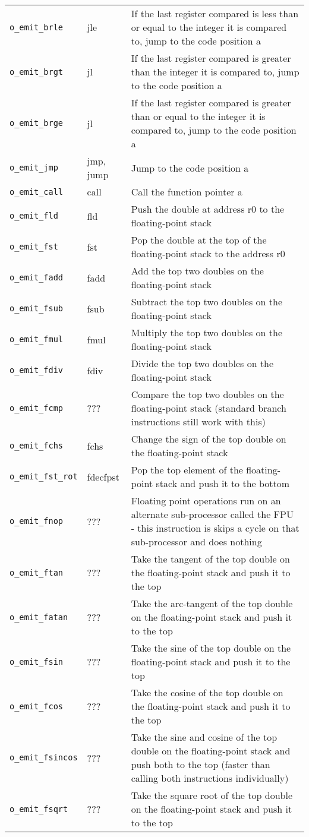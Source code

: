 \documentclass[10pt,a4paper]{article}
\begin{document}
{\begin{tabular}{l l p{10cm}}
\verb|o_emit_brle| & jle & If the last register compared is less than or equal to the integer it is compared to, jump to the code position a \\
\verb|o_emit_brgt| & jl & If the last register compared is greater than the integer it is compared to, jump to the code position a \\
\verb|o_emit_brge| & jl & If the last register compared is greater than or equal to the integer it is compared to, jump to the code position a \\
\verb|o_emit_jmp| & jmp, jump & Jump to the code position a \\
\verb|o_emit_call| & call & Call the function pointer a \\
\verb|o_emit_fld| & fld & Push the double at address r0 to the floating-point stack \\
\verb|o_emit_fst| & fst & Pop the double at the top of the floating-point stack to the address r0 \\
\verb|o_emit_fadd| & fadd & Add the top two doubles on the floating-point stack \\
\verb|o_emit_fsub| & fsub & Subtract the top two doubles on the floating-point stack \\
\verb|o_emit_fmul| & fmul & Multiply the top two doubles on the floating-point stack \\
\verb|o_emit_fdiv| & fdiv & Divide the top two doubles on the floating-point stack \\
\verb|o_emit_fcmp| & ??? & Compare the top two doubles on the floating-point stack (standard branch instructions still work with this) \\
\verb|o_emit_fchs| & fchs & Change the sign of the top double on the floating-point stack \\
\verb|o_emit_fst_rot| & fdecfpst & Pop the top element of the floating-point stack and push it to the bottom \\
\verb|o_emit_fnop| & ??? & Floating point operations run on an alternate sub-processor called the FPU - this instruction is skips a cycle on that sub-processor and does nothing \\
\verb|o_emit_ftan| & ??? & Take the tangent of the top double on the floating-point stack and push it to the top \\
\verb|o_emit_fatan| & ??? & Take the arc-tangent of the top double on the floating-point stack and push it to the top \\
\verb|o_emit_fsin| & ??? & Take the sine of the top double on the floating-point stack and push it to the top \\
\verb|o_emit_fcos| & ??? & Take the cosine of the top double on the floating-point stack and push it to the top \\
\verb|o_emit_fsincos| & ??? & Take the sine and cosine of the top double on the floating-point stack and push both to the top (faster than calling both instructions individually) \\
\verb|o_emit_fsqrt| & ??? & Take the square root of the top double on the floating-point stack and push it to the top \\
\hline
\end{tabular}
}
\end{document}
